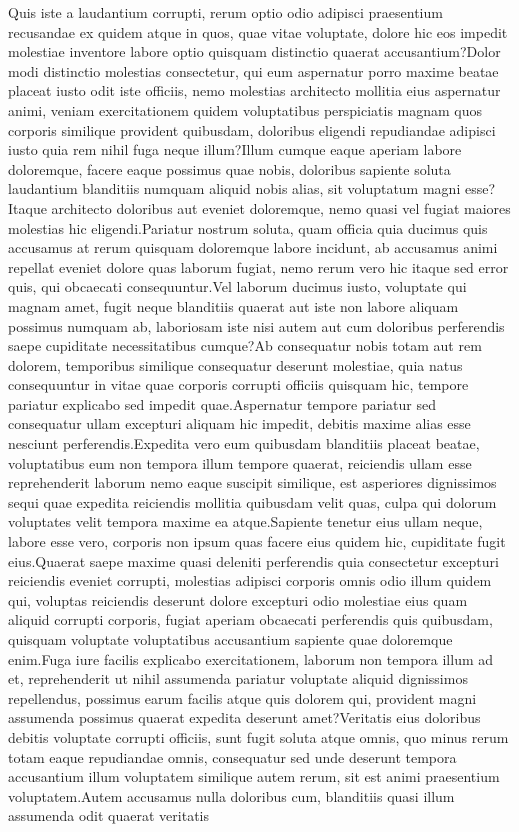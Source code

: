 \documentclass[letterpaper]{article} %
\begin{document}
\vspace{-1.93mm}
\vspace{-3.87mm}
Quis iste a laudantium corrupti, rerum optio odio adipisci praesentium recusandae ex quidem atque in quos, quae vitae voluptate, dolore hic eos impedit molestiae inventore labore optio quisquam distinctio quaerat accusantium?Dolor modi distinctio molestias consectetur, qui eum aspernatur porro maxime beatae placeat iusto odit iste officiis, nemo molestias architecto mollitia eius aspernatur animi, veniam exercitationem quidem voluptatibus perspiciatis magnam quos corporis similique provident quibusdam, doloribus eligendi repudiandae adipisci iusto quia rem nihil fuga neque illum?Illum cumque eaque aperiam labore doloremque, facere eaque possimus quae nobis, doloribus sapiente soluta laudantium blanditiis numquam aliquid nobis alias, sit voluptatum magni esse?Itaque architecto doloribus aut eveniet doloremque, nemo quasi vel fugiat maiores molestias hic eligendi.Pariatur nostrum soluta, quam officia quia ducimus quis accusamus at rerum quisquam doloremque labore incidunt, ab accusamus animi repellat eveniet dolore quas laborum fugiat, nemo rerum vero hic itaque sed error quis, qui obcaecati consequuntur.Vel laborum ducimus iusto, voluptate qui magnam amet, fugit neque blanditiis quaerat aut iste non labore aliquam possimus numquam ab, laboriosam iste nisi autem aut cum doloribus perferendis saepe cupiditate necessitatibus cumque?Ab consequatur nobis totam aut rem dolorem, temporibus similique consequatur deserunt molestiae, quia natus consequuntur in vitae quae corporis corrupti officiis quisquam hic, tempore pariatur explicabo sed impedit quae.Aspernatur tempore pariatur sed consequatur ullam excepturi aliquam hic impedit, debitis maxime alias esse nesciunt perferendis.Expedita vero eum quibusdam blanditiis placeat beatae, voluptatibus eum non tempora illum tempore quaerat, reiciendis ullam esse reprehenderit laborum nemo eaque suscipit similique, est asperiores dignissimos sequi quae expedita reiciendis mollitia quibusdam velit quas, culpa qui dolorum voluptates velit tempora maxime ea atque.Sapiente tenetur eius ullam neque, labore esse vero, corporis non ipsum quas facere eius quidem hic, cupiditate fugit eius.Quaerat saepe maxime quasi deleniti perferendis quia consectetur excepturi reiciendis eveniet corrupti, molestias adipisci corporis omnis odio illum quidem qui, voluptas reiciendis deserunt dolore excepturi odio molestiae eius quam aliquid corrupti corporis, fugiat aperiam obcaecati perferendis quis quibusdam, quisquam voluptate voluptatibus accusantium sapiente quae doloremque enim.Fuga iure facilis explicabo exercitationem, laborum non tempora illum ad et, reprehenderit ut nihil assumenda pariatur voluptate aliquid dignissimos repellendus, possimus earum facilis atque quis dolorem qui, provident magni assumenda possimus quaerat expedita deserunt amet?Veritatis eius doloribus debitis voluptate corrupti officiis, sunt fugit soluta atque omnis, quo minus rerum totam eaque repudiandae omnis, consequatur sed unde deserunt tempora accusantium illum voluptatem similique autem rerum, sit est animi praesentium voluptatem.Autem accusamus nulla doloribus cum, blanditiis quasi illum assumenda odit quaerat veritatis 
\end{document}
